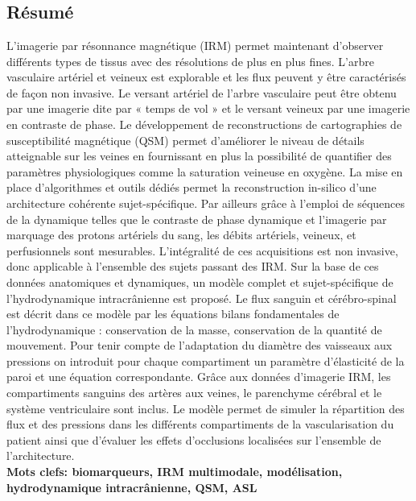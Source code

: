 \chapter*{}


\section*{Résumé}
L’imagerie par résonnance magnétique (IRM) permet maintenant d’observer différents types
de tissus avec des résolutions de plus en plus fines. L’arbre vasculaire artériel et veineux est explorable
et les flux peuvent y être caractérisés de façon non invasive. Le versant artériel de l’arbre vasculaire
peut être obtenu par une imagerie dite par « temps de vol » et le versant veineux par une imagerie en
contraste de phase. Le développement de reconstructions de cartographies de susceptibilité
magnétique (QSM) permet d’améliorer le niveau de détails atteignable sur les veines en fournissant
en plus la possibilité de quantifier des paramètres physiologiques comme la saturation veineuse en
oxygène. La mise en place d’algorithmes et outils dédiés permet la reconstruction in-silico d’une
architecture cohérente sujet-spécifique. Par ailleurs grâce à l’emploi de séquences de la dynamique
telles que le contraste de phase dynamique et l’imagerie par marquage des protons artériels du sang,
les débits artériels, veineux, et perfusionnels sont mesurables. L’intégralité de ces acquisitions est non
invasive, donc applicable à l’ensemble des sujets passant des IRM. Sur la base de ces données
anatomiques et dynamiques, un modèle complet et sujet-spécifique de l’hydrodynamique
intracrânienne est proposé. Le flux sanguin et cérébro-spinal est décrit dans ce modèle par les
équations bilans fondamentales de l’hydrodynamique : conservation de la masse, conservation de la
quantité de mouvement. Pour tenir compte de l’adaptation du diamètre des vaisseaux aux pressions
on introduit pour chaque compartiment un paramètre d’élasticité de la paroi et une équation
correspondante. Grâce aux données d’imagerie IRM, les compartiments sanguins des artères aux
veines, le parenchyme cérébral et le système ventriculaire sont inclus. Le modèle permet de simuler la
répartition des flux et des pressions dans les différents compartiments de la vascularisation du patient
ainsi que d’évaluer les effets d’occlusions localisées sur l’ensemble de l’architecture.\\

{\bf Mots clefs: biomarqueurs, IRM multimodale, modélisation, hydrodynamique intracrânienne, QSM,
ASL}

